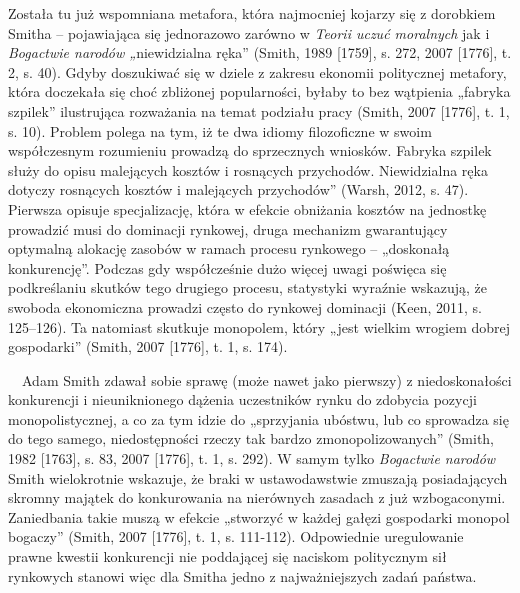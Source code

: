 \documentclass[a4paper]{article}
\begin{document}
Została tu już wspomniana metafora, która najmocniej kojarzy się z dorobkiem Smitha – pojawiająca się jednorazowo zarówno w \textit{Teorii uczuć moralnych} jak i \textit{Bogactwie narodów „}niewidzialna ręka” \label{ref:RND3arQWlZpRs}(Smith, 1989 [1759], s. 272, 2007 [1776], t. 2, s. 40). Gdyby doszukiwać się w dziele z zakresu ekonomii politycznej metafory, która doczekała się choć zbliżonej popularności, byłaby to bez wątpienia „fabryka szpilek” ilustrująca rozważania na temat podziału pracy \label{ref:RNDhErhk4QekH}(Smith, 2007 [1776], t. 1, s. 10). Problem polega na tym, iż te dwa idiomy filozoficzne w swoim współczesnym rozumieniu prowadzą do sprzecznych wniosków. Fabryka szpilek służy do opisu malejących kosztów i rosnących przychodów. Niewidzialna ręka dotyczy rosnących kosztów i malejących przychodów” \label{ref:RNDXgp9RVVtIw}(Warsh, 2012, s. 47). Pierwsza opisuje specjalizację, która w efekcie obniżania kosztów na jednostkę prowadzić musi do dominacji rynkowej, druga mechanizm gwarantujący optymalną alokację zasobów w ramach procesu rynkowego – „doskonałą konkurencję”. Podczas gdy współcześnie dużo więcej uwagi poświęca się podkreślaniu skutków tego drugiego procesu, statystyki wyraźnie wskazują, że swoboda ekonomiczna prowadzi często do rynkowej dominacji \label{ref:RNDf5LDvzVDLR}(Keen, 2011, s. 125–126). Ta natomiast skutkuje monopolem, który „jest wielkim wrogiem dobrej gospodarki” \label{ref:RNDQi3f6tgrVU}(Smith, 2007 [1776], t. 1, s. 174). 

 \ \ Adam Smith zdawał sobie sprawę (może nawet jako pierwszy) z niedoskonałości konkurencji i nieuniknionego dążenia uczestników rynku do zdobycia pozycji monopolistycznej, a co za tym idzie do „sprzyjania ubóstwu, lub co sprowadza się do tego samego, niedostępności rzeczy tak bardzo zmonopolizowanych” \label{ref:RNDSBDgty6ieq}(Smith, 1982 [1763], s. 83, 2007 [1776], t. 1, s. 292). W samym tylko \textit{Bogactwie narodów} Smith wielokrotnie wskazuje, że braki w ustawodawstwie zmuszają posiadających skromny majątek do konkurowania na nierównych zasadach z już wzbogaconymi. Zaniedbania takie muszą w efekcie „stworzyć w każdej gałęzi gospodarki monopol bogaczy” \label{ref:RNDnMNpl04czP}(Smith, 2007 [1776], t. 1, s. 111-112). Odpowiednie uregulowanie prawne kwestii konkurencji nie poddającej się naciskom politycznym sił rynkowych stanowi więc dla Smitha jedno z najważniejszych zadań państwa.
\end{document}
